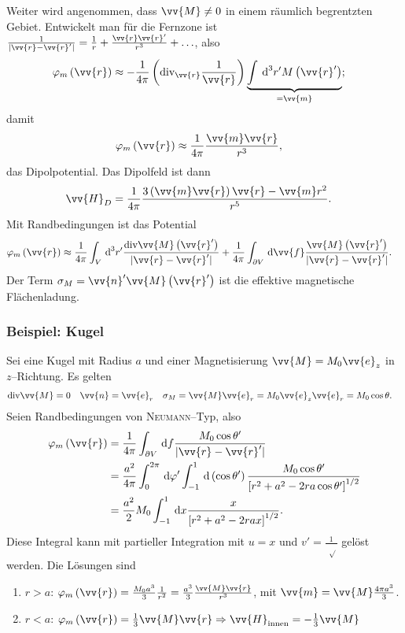 \documentclass[a4paper,12pt]{article}
\newcommand{\td}{\,\text{d}}
\numberwithin{equation}{section}
\begin{document}
Weiter wird angenommen, dass $\vv{M}\neq 0$ in einem räumlich begrentzten Gebiet. Entwickelt man für die Fernzone ist $\tfrac{1}{|\vv{r}-\vv{r}'|}=\tfrac{1}{r}+\tfrac{\vv{r}\vv{r}'}{r^3}+\hdots $, also
\begin{align} 
        \varphi _m\left(\vv{r}\right)&\approx -\dfrac{1}{4\pi }\left(\text{div}_{\vv{r}}\dfrac{1}{\vv{r}}\right)\underbrace{\int_{}^{}\td ^3r'M\left(\vv{r}'\right)}_{=\vv{m}}
;\end{align} 
damit
\begin{align} 
        \varphi _m\left(\vv{r}\right)&\approx \dfrac{1}{4\pi }\dfrac{\vv{m}\vv{r}}{r^3}
,\end{align} 
das Dipolpotential. 
Das Dipolfeld ist dann
\begin{align} 
        \vv{H}_D&=\dfrac{1}{4\pi }\dfrac{3\left(\vv{m}\vv{r}\right)\vv{r}-\vv{m}r^2}{r^5}
.\end{align} 
Mit Randbedingungen ist das Potential
\begin{align} 
        \varphi _m\left(\vv{r}\right)&\approx \dfrac{1}{4\pi }\int_{V}^{}\td ^3r'\dfrac{\text{div}\vv{M}\left(\vv{r}'\right)}{|\vv{r}-\vv{r}'|}+\dfrac{1}{4\pi }\int_{\partial V}^{}\td \vv{f}\dfrac{\vv{M}\left(\vv{r}'\right)}{|\vv{r}-\vv{r}'|}
.\end{align} 
Der Term $\sigma _M=\vv{n}'\vv{M}\left(\vv{r}'\right)$ ist die effektive magnetische Flächenladung.

\subsubsection{Beispiel: Kugel}
Sei eine Kugel mit Radius $a$ und einer Magnetisierung $\vv{M}=M_0\vv{e}_z$ in $z$--Richtung. 
Es gelten
\begin{align} 
        \text{div}\vv{M}&=0&\vv{n}&=\vv{e}_r&\sigma _M&=\vv{M}\vv{e}_r=M_0\vv{e}_z\vv{e}_r=M_0\cos \theta 
.\end{align} 
Seien Randbedingungen von \textsc{Neumann}--Typ, also
\begin{align} 
        \varphi _m\left(\vv{r}\right)&=\dfrac{1}{4\pi }\int_{\partial V}^{}\td f\dfrac{M_0\cos \theta '}{|\vv{r}-\vv{r}'|}\\
                                     &=\dfrac{a^2}{4\pi }\int_{0}^{2\pi }\td \varphi '\int_{-1}^{1}\td \left(\cos \theta '\right)\dfrac{M_0\cos \theta '}{\left[r^2+a^2-2ra\cos \theta '\right]^{1/2}}\\
                                     &=\dfrac{a^2}{2}M_0\int_{-1}^{1}\td x\dfrac{x}{\left[r^2+a^2-2r ax\right]^{1/2}}
.\end{align} 
Diese Integral kann mit partieller Integration mit $u=x$ und $v'=\tfrac{1}{\,\sqrt[]{}}$ gelöst werden.
Die Lösungen sind
\begin{enumerate}[label=\roman*)]
        \item $r>a$: $\varphi _m\left(\vv{r}\right)=\tfrac{M_0a^3}{3}\tfrac{1}{r^2}=\tfrac{a^3}{3}\tfrac{\vv{M}\vv{r}}{r^3}$, mit $\vv{m}=\vv{M}\tfrac{4\pi a^3}{3}$.
        \item $r<a$: $\varphi _m\left(\vv{r}\right)=\tfrac{1}{3}\vv{M}\vv{r}\Rightarrow \vv{H}_{\text{innen}}=-\tfrac{1}{3}\vv{M}$ 
\end{enumerate}
\end{document}
